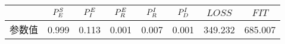 \begin{tabular}{cccccccc}
\hline
&$\P{S}{E}$&$\P{E}{I}$&$\P{E}{R}$&$\P{I}{R}$&$\P{I}{D}$&$LOSS$&$FIT$\\
\hline
参数值&0.999&0.113&0.001&0.007&0.001&349.232&685.007\\
\hline
\end{tabular}